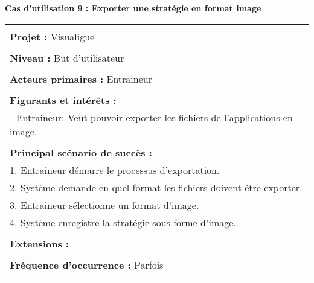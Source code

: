 \newpage
\begin{flushleft}
	\textbf{Cas d'utilisation 9 : Exporter une stratégie en format image}\\
\end{flushleft}
\begin{tabular}{|p{16cm}|}
	\hline
	\\
	\textbf{Projet :} Visualigue\\
	\\
	\textbf{Niveau :} But d'utilisateur\\
	\\
	\textbf{Acteurs primaires :} Entraineur\\
	\\
	\textbf{Figurants et intérêts :} \\
	- Entraineur: Veut pouvoir exporter les fichiers de l'applications en image.\\
	\\
	\textbf{Principal scénario de succès :}\\
	1. Entraineur démarre le processus d'exportation.\\
	2. Système demande en quel format les fichiers doivent être exporter.\\
	3. Entraineur sélectionne un format d'image.\\
	4. Système enregistre la stratégie sous forme d'image.\\
	\\
	\textbf{Extensions :}\\
	\\
	\textbf{Fréquence d'occurrence :} Parfois\\
	\\
	\hline
\end{tabular}

